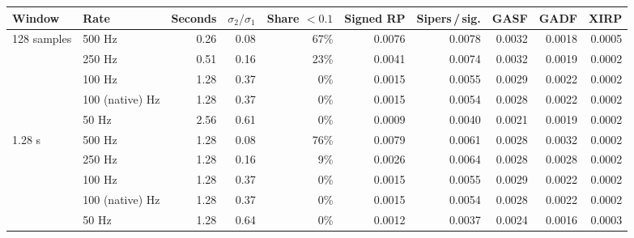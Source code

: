 \begin{tabular}{@{}llrrrrrrrr@{}}
\toprule
Window & Rate & Seconds & $\sigma_2/\sigma_1$ & Share $<0.1$ & Signed RP & Sipers\,/\,sig. & GASF & GADF & XIRP \\
\midrule
128 samples & 500 Hz & 0.26 & 0.08 & 67\% & 0.0076 & 0.0078 & 0.0032 & 0.0018 & 0.0005 \\
 & 250 Hz & 0.51 & 0.16 & 23\% & 0.0041 & 0.0074 & 0.0032 & 0.0019 & 0.0002 \\
 & 100 Hz & 1.28 & 0.37 & 0\% & 0.0015 & 0.0055 & 0.0029 & 0.0022 & 0.0002 \\
 & 100 (native) Hz & 1.28 & 0.37 & 0\% & 0.0015 & 0.0054 & 0.0028 & 0.0022 & 0.0002 \\
 & 50 Hz & 2.56 & 0.61 & 0\% & 0.0009 & 0.0040 & 0.0021 & 0.0019 & 0.0002 \\
\midrule
1.28 s & 500 Hz & 1.28 & 0.08 & 76\% & 0.0079 & 0.0061 & 0.0028 & 0.0032 & 0.0002 \\
 & 250 Hz & 1.28 & 0.16 & 9\% & 0.0026 & 0.0064 & 0.0028 & 0.0028 & 0.0002 \\
 & 100 Hz & 1.28 & 0.37 & 0\% & 0.0015 & 0.0055 & 0.0029 & 0.0022 & 0.0002 \\
 & 100 (native) Hz & 1.28 & 0.37 & 0\% & 0.0015 & 0.0054 & 0.0028 & 0.0022 & 0.0002 \\
 & 50 Hz & 1.28 & 0.64 & 0\% & 0.0012 & 0.0037 & 0.0024 & 0.0016 & 0.0003 \\
\bottomrule
\end{tabular}
